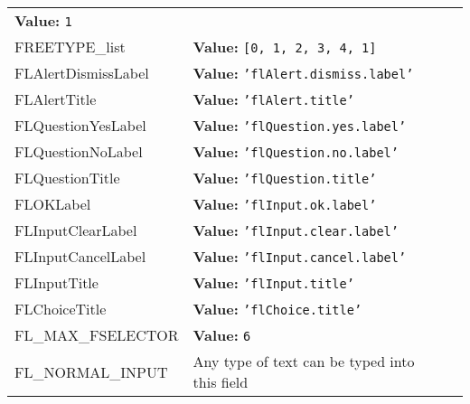 \begin{longtable}{|p{\varnamewidth}|p{\vardescrwidth}|l}
\textbf{Value:} 
{\tt 1}&\\
\cline{1-2}
\raggedright F\-R\-E\-E\-T\-Y\-P\-E\-\_\-l\-i\-s\-t\- & \raggedright \textbf{Value:} 
{\tt \texttt{[}0\texttt{, }1\texttt{, }2\texttt{, }3\texttt{, }4\texttt{, }1\texttt{]}}&\\
\cline{1-2}
\raggedright F\-L\-A\-l\-e\-r\-t\-D\-i\-s\-m\-i\-s\-s\-L\-a\-b\-e\-l\- & \raggedright \textbf{Value:} 
{\tt \texttt{'}\texttt{flAlert.dismiss.label}\texttt{'}}&\\
\cline{1-2}
\raggedright F\-L\-A\-l\-e\-r\-t\-T\-i\-t\-l\-e\- & \raggedright \textbf{Value:} 
{\tt \texttt{'}\texttt{flAlert.title}\texttt{'}}&\\
\cline{1-2}
\raggedright F\-L\-Q\-u\-e\-s\-t\-i\-o\-n\-Y\-e\-s\-L\-a\-b\-e\-l\- & \raggedright \textbf{Value:} 
{\tt \texttt{'}\texttt{flQuestion.yes.label}\texttt{'}}&\\
\cline{1-2}
\raggedright F\-L\-Q\-u\-e\-s\-t\-i\-o\-n\-N\-o\-L\-a\-b\-e\-l\- & \raggedright \textbf{Value:} 
{\tt \texttt{'}\texttt{flQuestion.no.label}\texttt{'}}&\\
\cline{1-2}
\raggedright F\-L\-Q\-u\-e\-s\-t\-i\-o\-n\-T\-i\-t\-l\-e\- & \raggedright \textbf{Value:} 
{\tt \texttt{'}\texttt{flQuestion.title}\texttt{'}}&\\
\cline{1-2}
\raggedright F\-L\-O\-K\-L\-a\-b\-e\-l\- & \raggedright \textbf{Value:} 
{\tt \texttt{'}\texttt{flInput.ok.label}\texttt{'}}&\\
\cline{1-2}
\raggedright F\-L\-I\-n\-p\-u\-t\-C\-l\-e\-a\-r\-L\-a\-b\-e\-l\- & \raggedright \textbf{Value:} 
{\tt \texttt{'}\texttt{flInput.clear.label}\texttt{'}}&\\
\cline{1-2}
\raggedright F\-L\-I\-n\-p\-u\-t\-C\-a\-n\-c\-e\-l\-L\-a\-b\-e\-l\- & \raggedright \textbf{Value:} 
{\tt \texttt{'}\texttt{flInput.cancel.label}\texttt{'}}&\\
\cline{1-2}
\raggedright F\-L\-I\-n\-p\-u\-t\-T\-i\-t\-l\-e\- & \raggedright \textbf{Value:} 
{\tt \texttt{'}\texttt{flInput.title}\texttt{'}}&\\
\cline{1-2}
\raggedright F\-L\-C\-h\-o\-i\-c\-e\-T\-i\-t\-l\-e\- & \raggedright \textbf{Value:} 
{\tt \texttt{'}\texttt{flChoice.title}\texttt{'}}&\\
\cline{1-2}
\raggedright F\-L\-\_\-M\-A\-X\-\_\-F\-S\-E\-L\-E\-C\-T\-O\-R\- & \raggedright \textbf{Value:} 
{\tt 6}&\\
\cline{1-2}
\raggedright F\-L\-\_\-N\-O\-R\-M\-A\-L\-\_\-I\-N\-P\-U\-T\- & \raggedright Any type of text can be typed into this field


\end{longtable}

